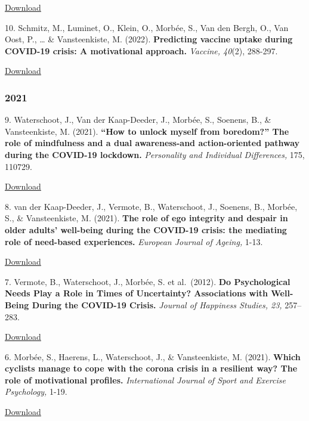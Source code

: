 \documentclass[
]{article}
\begin{document}
\href{download/sciencs/studies/COVIDpaperWauetrs.pdf}{Download }

10. Schmitz, M., Luminet, O., Klein, O., Morbée, S., Van den Bergh, O.,
Van Oost, P., \ldots{} \& Vansteenkiste, M. (2022). \textbf{Predicting
vaccine uptake during COVID-19 crisis: A motivational approach.}
\emph{Vaccine, 40}(2), 288-297.

\href{download/sciencs/studies/1-s2.0-S0264410X21015425-main.pdf}{Download
}

\hypertarget{section-1}{%
\subsubsection{2021}\label{section-1}}

9. Waterschoot, J., Van der Kaap-Deeder, J., Morbée, S., Soenens, B., \&
Vansteenkiste, M. (2021). \textbf{``How to unlock myself from boredom?''
The role of mindfulness and a dual awareness-and action-oriented pathway
during the COVID-19 lockdown.} \emph{Personality and Individual
Differences, }175, 110729.

\href{download/sciencs/studies/1-s2.0-S0191886921001045-main.pdf}{Download
}

8. van der Kaap-Deeder, J., Vermote, B., Waterschoot, J., Soenens, B.,
Morbée, S., \& Vansteenkiste, M. (2021). \textbf{The role of ego
integrity and despair in older adults' well-being during the COVID-19
crisis: the mediating role of need-based experiences.} \emph{European
Journal of Ageing, }1-13.

\href{download/sciencs/studies/VanDerKaap-Deeder2021_Article_TheRoleOfEgoIntegrityAndDespai.pdf}{Download
}

7. Vermote, B., Waterschoot, J., Morbée, S. et al.~(2012). \textbf{Do
Psychological Needs Play a Role in Times of Uncertainty? Associations
with Well-Being During the COVID-19 Crisis.} \emph{Journal of Happiness
Studies, 23, }257-- 283.

\href{download/sciencs/studies/Vermote_et_al-2021-Journal_of_Happiness_Studies.pdf}{Download
}

6. Morbée, S., Haerens, L., Waterschoot, J., \& Vansteenkiste, M.
(2021). \textbf{Which cyclists manage to cope with the corona crisis in
a resilient way? The role of motivational profiles.} \emph{International
Journal of Sport and Exercise Psychology,} 1-19.

\href{download/sciencs/studies/sUc8WN-Which\%20cyclists\%20manage\%20to\%20cope\%20with\%20the\%20corona\%20crisis\%20in\%20a\%20resilient\%20way\%20The\%20role\%20of\%20motivational\%20profiles.pdf}{Download
}
\end{document}
